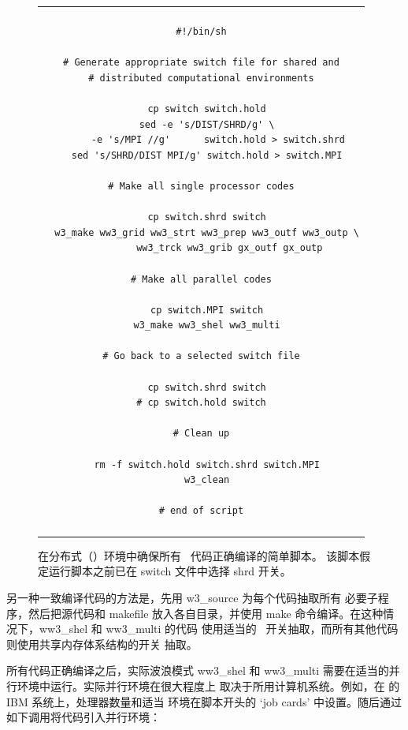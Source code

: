 \begin{figure}
\begin{center} \begin{tabular}{|c|} \hline \\
\begin{minipage}{5in}
\begin{verbatim}
#!/bin/sh

# Generate appropriate switch file for shared and
# distributed computational environments

  cp switch switch.hold
  sed -e 's/DIST/SHRD/g' \
      -e 's/MPI //g'      switch.hold > switch.shrd
  sed 's/SHRD/DIST MPI/g' switch.hold > switch.MPI

# Make all single processor codes

  cp switch.shrd switch
  w3_make ww3_grid ww3_strt ww3_prep ww3_outf ww3_outp \
          ww3_trck ww3_grib gx_outf gx_outp

# Make all parallel codes

  cp switch.MPI switch
  w3_make ww3_shel ww3_multi

# Go back to a selected switch file

  cp switch.shrd switch
# cp switch.hold switch

# Clean up

  rm -f switch.hold switch.shrd switch.MPI
  w3_clean

# end of script
\end{verbatim}
\end{minipage} \\ \\ \hline
\end{tabular} \end{center}

\caption{在分布式（\mpi）环境中确保所有 \ws\ 代码正确编译的简单脚本。
   该脚本假定运行脚本之前已在 {\file switch} 文件中选择 {\F shrd} 开关。}
   \label{fig:make_MPI}
\end{figure}

另一种一致编译代码的方法是，先用 {\file w3\_source} 为每个代码抽取所有
必要子程序，然后把源代码和 makefile 放入各自目录，并使用 {\file make}
命令编译。在这种情况下，{\file ww3\_shel} 和 {\file ww3\_multi} 的代码
使用适当的 \mpi\ 开关抽取，而所有其他代码则使用共享内存体系结构的开关
抽取。

所有代码正确编译之后，实际波浪模式 {\file ww3\_shel} 和
{\code ww3\_multi} 需要在适当的并行环境中运行。实际并行环境在很大程度上
取决于所用计算机系统。例如，在 {\ncep} 的 IBM 系统上，处理器数量和适当
环境在脚本开头的 `job cards' 中设置。随后通过如下调用将代码引入并行环境：


